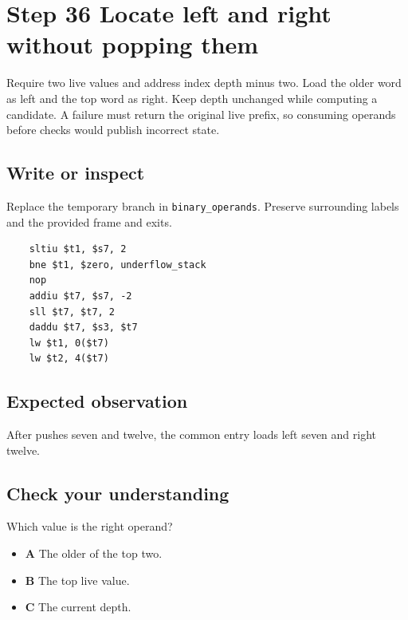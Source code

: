 \section{Step 36 Locate left and right without popping them}\label{vm-s36}

Require two live values and address index depth minus two. Load the older word as left and the top word as right. Keep depth unchanged while computing a candidate. A failure must return the original live prefix, so consuming operands before checks would publish incorrect state.

\subsection{Write or inspect}
Replace the temporary branch in \texttt{binary\_operands}. Preserve surrounding labels and the provided frame and exits.

\begin{verbatim}
    sltiu $t1, $s7, 2
    bne $t1, $zero, underflow_stack
    nop
    addiu $t7, $s7, -2
    sll $t7, $t7, 2
    daddu $t7, $s3, $t7
    lw $t1, 0($t7)
    lw $t2, 4($t7)
\end{verbatim}
\subsection{Expected observation}
After pushes seven and twelve, the common entry loads left seven and right twelve.

\subsection{Check your understanding}
Which value is the right operand?

\begin{itemize}
  \item \textbf{A} The older of the top two.
  \item \textbf{B} The top live value.
  \item \textbf{C} The current depth.
\end{itemize}
